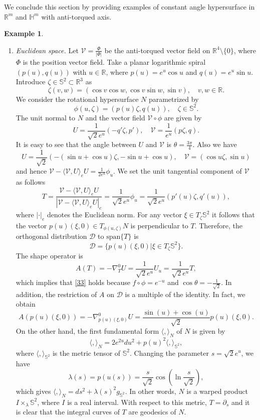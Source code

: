 \documentclass[12pt]{amsart}
\def\r{\mathbb R}
\def\s{\mathbb S}
\def\h{\mathbb H}
\def\v{\mathcal V}
\theoremstyle{definition}
\newtheorem{example}[theorem]{Example}
\begin{document}
We conclude this section by providing examples of constant angle hypersurface in $\r^m$ and $\h^m$ with anti-torqued axis.

\begin{example} \label{ehs}
\begin{enumerate}
\item {\it Euclidean space.} Let $\v=\frac{\Phi}{|\Phi|}$ be the anti-torqued vector field on $\r^4 \setminus\{0\}$, where $\Phi$ is the position vector field. Take a planar logarithmic spiral $(p(u),q(u))$ with $u\in \r$, where $p(u)=e^u\cos u$ and $q(u)=e^u\sin u$. Introduce $\zeta \in \s^2 \subset \r^3$ as 
$$
\zeta(v,w)=(\cos v\cos w,\cos v\sin w,\sin v), \quad v,w\in\r.
$$
We consider the rotational hypersurface $N$ parametrized by
\begin{equation}
\phi(u,\zeta)=(p(u)\zeta,q(u)), \quad \zeta \in \s^2. \label{rotpar}
\end{equation}
The unit normal to $N$ and the vector field $\v\circ \phi$ are given by
$$
U=\frac{1}{\sqrt{2}e^u}(-q'\zeta,p'), \quad \v=\frac{1}{e^u}(p\zeta,q).
$$
It is easy to see that the angle between $U$ and $\v$ is $\theta=\frac{3\pi}{4}$. Also we have 
$$
U=\frac{1}{\sqrt{2}}(-(\sin u+\cos u)\zeta,-\sin u+\cos u), \quad \v=(\cos u\zeta,\sin u)
$$
and hence $\v-\langle \v, U \rangle_e U=\frac{1}{2e^u}\phi_u$. We set the unit tangential component of $\v$ as follows
$$
T=\frac{\v-\langle \v, U \rangle_e U}{|\v-\langle \v, U \rangle_e U|_e}=\frac{1}{\sqrt{2}e^u}\phi_u=\frac{1}{\sqrt{2}e^u}(p'(u)\zeta,q'(u)),
$$
where $|\cdot|_e$ denotes the Euclidean norm. For any vector $\xi \in T_\zeta\s^2$ it follows that the vector $p(u)(\xi,0)\in T_{\phi(u,\zeta)}N$ is perpendicular to $T$. Therefore, the orthogonal distribution $\mathcal{D}$ to $\mbox{span} \{T\}$ is
$$
\mathcal{D}=\{p(u)(\xi,0)|\xi \in T_\zeta\s^2\}.
$$
The shape operator is
$$
A(T)=-\nabla^0_TU=\frac{1}{\sqrt{2}e^u}U_u=\frac{1}{\sqrt{2}e^u}T,
$$
which implies that \eqref{33} holds because $f\circ \phi =e^{-u}$ and $\cos\theta=-\frac{1}{\sqrt{2}}$. In addition, the restriction of $A$ on $\mathcal{D}$ is a multiple of the identity. In fact, we obtain
$$
A(p(u)(\xi,0))=-\nabla^0_{p(u)(\xi,0)}U=\frac{\sin(u)+\cos(u)}{\sqrt{2}}p(u)(\xi,0).
$$
On the other hand, the first fundamental form $\langle,\rangle_N$ of $N$ is given by
$$\langle,\rangle_N=2e^{2u}du^2+p(u)^2\langle,\rangle_{\s^2},$$
where $\langle,\rangle_{\s^2}$ is the metric tensor of $\s^2$. Changing the parameter $s=\sqrt{2}e^u$, we have 
$$
\lambda(s)=p(u(s))=\frac{s}{\sqrt{2}}\cos (\ln \frac{s}{\sqrt{2}}),
$$
which gives $\langle,\rangle_N=ds^2+\lambda(s)^2g_{\s^2}$. In other words, $N$ is a warped product $I\times_\lambda \s^2$, where $I$ is a real interval. With respect to this metric, $T=\partial_s$ and it is clear that the integral curves of $T$ are geodesics of $N$.

\end{enumerate}
\end{example}
\end{document}
